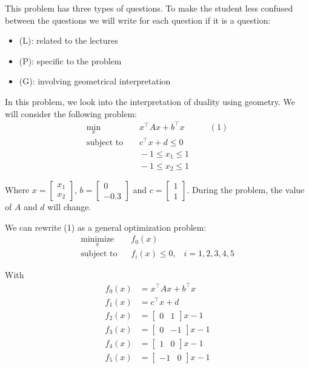 
This problem has three types of questions. To make the student less confused between the questions we will write for each question if it is a question:
\begin{itemize}
    \item (L): related to the lectures
    \item (P): specific to the problem
    \item (G): involving geometrical interpretation
\end{itemize}


In this problem, we look into the interpretation of duality using geometry.
We will consider the following problem:
\begin{align*}
    \min_x &\;\;\;\; x^\top A x + b^\top x &&& (1)\\
    \text{subject to} & \;\;\;\; c^\top x + d \leq 0 \\
    & \;\;\;\; -1 \leq x_1 \leq 1 \\
    & \;\;\;\; -1 \leq x_2 \leq 1
\end{align*}

Where $x = \begin{bmatrix} x_1 \\ x_2 \end{bmatrix}$, $b = \begin{bmatrix} 0 \\ -0.3 \end{bmatrix}$ and $c = \begin{bmatrix} 1 \\ 1 \end{bmatrix}$.
During the problem, the value of $A$ and $d$ will change.

We can rewrite (1) as a general optimization problem:
\begin{align*}
    \underset{x}{\text{minimize}}\;\;\;&f_0(x)\\
    \text{subject to}\;\;\;&f_i(x)\leq 0,\;\;\;i = 1,2,3,4,5
\end{align*}

With 
\begin{align*}
    f_0(x) &= x^\top A x + b^\top x \\
    f_1(x) &= c^\top x + d \\
    f_2(x) &= \begin{bmatrix} 0 & 1 \end{bmatrix} x - 1\\
    f_3(x) &= \begin{bmatrix} 0 & -1 \end{bmatrix} x - 1\\
    f_4(x) &= \begin{bmatrix} 1 & 0 \end{bmatrix} x - 1\\
    f_5(x) &= \begin{bmatrix} -1 & 0 \end{bmatrix} x - 1
\end{align*}

